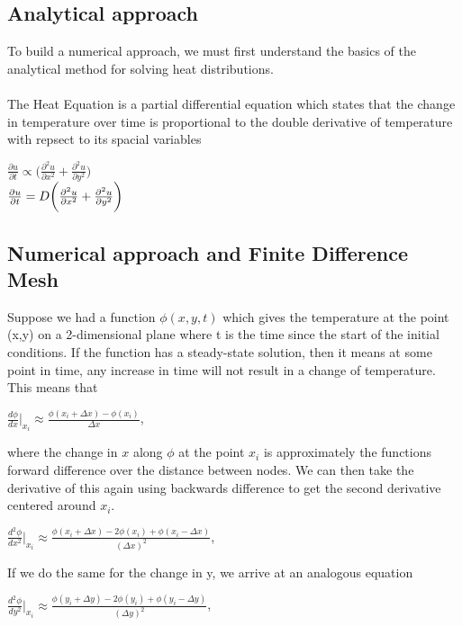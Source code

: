 \documentclass[12pt,a4paper]{article}
\begin{document}
\subsection{Analytical approach}
To build a numerical approach, we must first understand the basics of the analytical method for solving heat distributions. \\\\The Heat Equation is a partial differential equation which states that the change in temperature over time is proportional to the double derivative of temperature with repsect to its spacial variables
\begin{center}
$\frac{\partial u}{\partial t} \propto \bigg(\frac{\partial^2 u}{\partial x^2} + \frac{\partial^2 u}{\partial y^2}\bigg)$
\\
$\frac{\partial u}{\partial t} = D\bigg{(}\frac{\partial^2 u}{\partial x^2} + \frac{\partial^2 u}{\partial y^2}\bigg{)}$
\end{center}

\subsection{Numerical approach and Finite Difference Mesh}
Suppose we had a function $\phi(x,y,t)$ which gives the temperature at the point (x,y) on a 2-dimensional plane where t is the time since the start of the initial conditions. If the function has a steady-state solution, then it means at some point in time, any increase in time will not result in a change of temperature. This means that 
\begin{center}
$\frac{d\phi}{dx}|_{x_i}\approx\frac{\phi(x_i+\Delta x)-\phi(x_i)}{\Delta x}$,
\end{center}
where the change in $x$ along $\phi$ at the point $x_i$ is approximately the functions forward difference over the distance between nodes. We can then take the derivative of this again using backwards difference to get the second derivative centered around $x_i$.
\begin{center}
$\frac{d^2\phi}{dx^2}|_{x_i}\approx\frac{\phi(x_i+\Delta x)-2\phi(x_i)+\phi(x_i-\Delta x)}{(\Delta x)^2}$,
\end{center}
If we do the same for the change in y, we arrive at an analogous equation
\begin{center}
$\frac{d^2\phi}{dy^2}|_{x_i}\approx\frac{\phi(y_i+\Delta y)-2\phi(y_i)+\phi(y_i-\Delta y)}{(\Delta y)^2}$,
\end{center}
\end{document}
